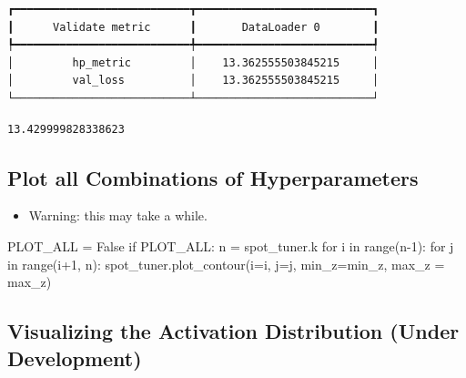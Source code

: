 \documentclass[
  letterpaper,
  DIV=11,
  numbers=noendperiod]{scrreprt}
\newenvironment{Shaded}{\begin{snugshade}}{\end{snugshade}}
\newcommand{\BuiltInTok}[1]{\textcolor[rgb]{0.00,0.23,0.31}{#1}}
\newcommand{\ControlFlowTok}[1]{\textcolor[rgb]{0.00,0.23,0.31}{#1}}
\newcommand{\DecValTok}[1]{\textcolor[rgb]{0.68,0.00,0.00}{#1}}
\newcommand{\KeywordTok}[1]{\textcolor[rgb]{0.00,0.23,0.31}{#1}}
\newcommand{\NormalTok}[1]{\textcolor[rgb]{0.00,0.23,0.31}{#1}}
\newcommand{\OperatorTok}[1]{\textcolor[rgb]{0.37,0.37,0.37}{#1}}
\newcommand{\VariableTok}[1]{\textcolor[rgb]{0.07,0.07,0.07}{#1}}
\providecommand{\tightlist}{%
  \setlength{\itemsep}{0pt}\setlength{\parskip}{0pt}}\usepackage{longtable,booktabs,array}
\begin{document}
\begin{verbatim}
┏━━━━━━━━━━━━━━━━━━━━━━━━━━━┳━━━━━━━━━━━━━━━━━━━━━━━━━━━┓
┃      Validate metric      ┃       DataLoader 0        ┃
┡━━━━━━━━━━━━━━━━━━━━━━━━━━━╇━━━━━━━━━━━━━━━━━━━━━━━━━━━┩
│         hp_metric         │    13.362555503845215     │
│         val_loss          │    13.362555503845215     │
└───────────────────────────┴───────────────────────────┘
\end{verbatim}

\begin{verbatim}
13.429999828338623
\end{verbatim}

\subsection{Plot all Combinations of
Hyperparameters}\label{plot-all-combinations-of-hyperparameters-4}

\begin{itemize}
\tightlist
\item
  Warning: this may take a while.
\end{itemize}

\begin{Shaded}
\begin{Highlighting}[]
\NormalTok{PLOT\_ALL }\OperatorTok{=} \VariableTok{False}
\ControlFlowTok{if}\NormalTok{ PLOT\_ALL:}
\NormalTok{    n }\OperatorTok{=}\NormalTok{ spot\_tuner.k}
    \ControlFlowTok{for}\NormalTok{ i }\KeywordTok{in} \BuiltInTok{range}\NormalTok{(n}\OperatorTok{{-}}\DecValTok{1}\NormalTok{):}
        \ControlFlowTok{for}\NormalTok{ j }\KeywordTok{in} \BuiltInTok{range}\NormalTok{(i}\OperatorTok{+}\DecValTok{1}\NormalTok{, n):}
\NormalTok{            spot\_tuner.plot\_contour(i}\OperatorTok{=}\NormalTok{i, j}\OperatorTok{=}\NormalTok{j, min\_z}\OperatorTok{=}\NormalTok{min\_z, max\_z }\OperatorTok{=}\NormalTok{ max\_z)}
\end{Highlighting}
\end{Shaded}

\subsection{Visualizing the Activation Distribution (Under
Development)}\label{visualizing-the-activation-distribution-under-development-2}
\end{document}
